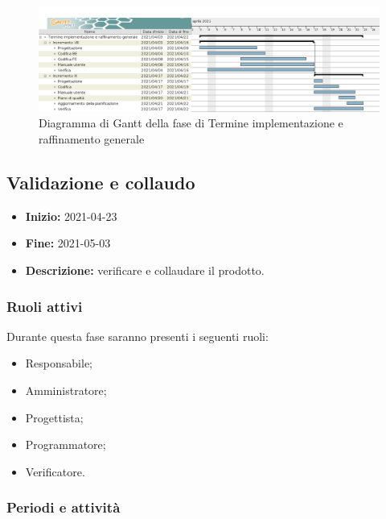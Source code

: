\begin{figure}[H]
    \centering
    \includegraphics[width=1\linewidth]{res/images/pianificazione/termine_implementazione_e_raffinamento_generale.png}
    \caption{Diagramma di Gantt della fase di Termine implementazione e raffinamento generale}
    \label{fig:_Gantt termine implementazione e raffinamento generale}
\end{figure}


\subsection{Validazione e collaudo} \label{_pianificazioneValidazioneCollaudo}
\begin{itemize}
    \item [] \textbf{Inizio:} 2021-04-23
    \item [] \textbf{Fine:} 2021-05-03
    \item [] \textbf{Descrizione:} verificare e collaudare il prodotto.
\end{itemize}

\subsubsection{Ruoli attivi}
Durante questa fase saranno presenti i seguenti ruoli:
\begin{itemize}
    \item Responsabile;
    \item Amministratore;
    \item Progettista;
    \item Programmatore;
    \item Verificatore.
\end{itemize}

\subsubsection{Periodi e attività}

